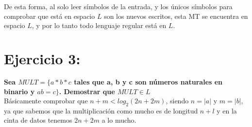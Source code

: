 \documentclass{article}
\begin{document}
De esta forma, al solo leer símbolos de la entrada, y los únicos símbolos para comprobar que está en espacio $L$ son los nuevos escritos, esta MT se encuentra en espacio $L$, y por lo tanto todo lenguaje regular está en $L$.

\section*{Ejercicio 3:}

\Large{\textbf{Sea $MULT = \{a * b * c$ tales que a, b y c son números naturales en binario y $a  b = c\}$. Demostrar que $MULT \in L$}}
\\

\normalsize
Básicamente comprobar que $n + m < log_2(2n + 2m)$, siendo $n = |a|$ y $m = |b|$, ya que sabemos que la multiplicación como mucho es de longitud $n + l$ y en la cinta de datos tenemos $2n + 2m$ a lo mucho.
\end{document}
